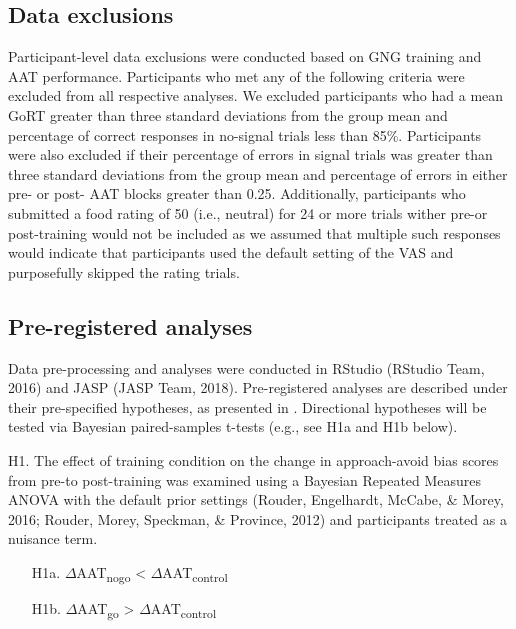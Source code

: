 \documentclass[man,floatsintext]{apa6}
\begin{document}
\hypertarget{data_exclusions}{%
\subsection{Data exclusions}\label{data_exclusions}}

\par

Participant-level data exclusions were conducted based on GNG training and AAT performance. Participants who met any of the following criteria were excluded from all respective analyses. We excluded participants who had a mean GoRT greater than three standard deviations from the group mean and percentage of correct responses in no-signal trials less than 85\%. Participants were also excluded if their percentage of errors in signal trials was greater than three standard deviations from the group mean and percentage of errors in either pre- or post- AAT blocks greater than 0.25. Additionally, participants who submitted a food rating of 50 (i.e., neutral) for 24 or more trials wither pre-or post-training would not be included as we assumed that multiple such responses would indicate that participants used the default setting of the VAS and purposefully skipped the rating trials.

\hypertarget{prereg_analyses}{%
\subsection{Pre-registered analyses}\label{prereg_analyses}}

\par

Data pre-processing and analyses were conducted in RStudio (RStudio Team, 2016) and JASP (JASP Team, 2018). Pre-registered analyses are described under their pre-specified hypotheses, as presented in \textit{}. Directional hypotheses will be tested via Bayesian paired-samples t-tests (e.g., see H1a and H1b below).

\noindent H1. The effect of training condition on the change in approach-avoid bias scores from pre-to post-training was examined using a Bayesian Repeated Measures ANOVA with the default prior settings (Rouder, Engelhardt, McCabe, \& Morey, 2016; Rouder, Morey, Speckman, \& Province, 2012) and participants treated as a nuisance term.

\begin{itemize}
\item[H1a.] $\Delta$AAT\textsubscript{nogo} <  $\Delta$AAT\textsubscript{control}  
\item[H1b.] $\Delta$AAT\textsubscript{go} >  $\Delta$AAT\textsubscript{control}
\end{itemize}
\end{document}

